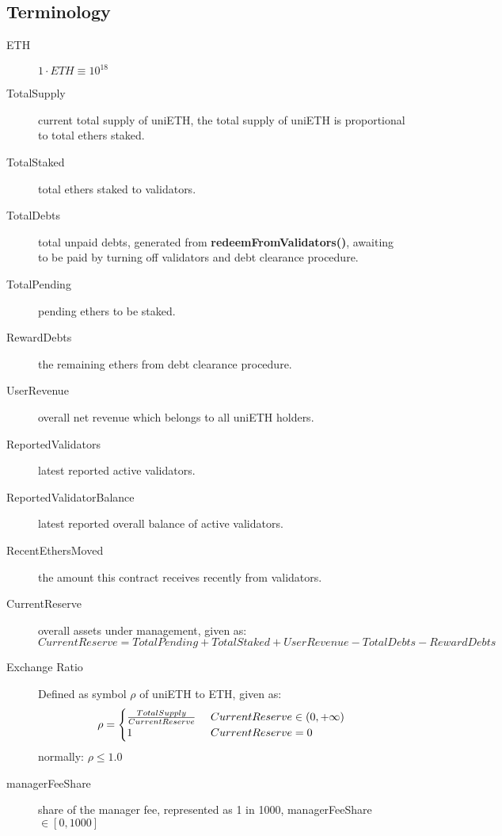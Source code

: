 \documentclass{article}
\begin{document}
\subsection{Terminology}
\begin{description}
   \item[ETH] $1\cdot ETH \equiv 10^{18}$
   \item[TotalSupply] current total supply of uniETH, the total supply of uniETH is proportional to total ethers staked.
   \item[TotalStaked] total ethers staked to validators.
   \item[TotalDebts] total unpaid debts, generated from \textbf{redeemFromValidators()}, awaiting to be paid by turning off validators and debt clearance procedure.
   \item[TotalPending] pending ethers to be staked.
   \item[RewardDebts] the remaining ethers from debt clearance procedure.
   \item[UserRevenue] overall net revenue which belongs to all uniETH holders.
   \item[ReportedValidators] latest reported active validators.
   \item[ReportedValidatorBalance] latest reported overall balance of active validators.
   \item[RecentEthersMoved] the amount this contract receives recently from validators.
   \item[CurrentReserve] overall assets under management, given as:
   \[CurrentReserve = TotalPending + TotalStaked + UserRevenue - TotalDebts - RewardDebts\]
   \item[Exchange Ratio] Defined as symbol $\rho$ of uniETH to ETH, given as: 
   \begin{equation}
    \rho = \begin{cases}
        \frac{TotalSupply}{CurrentReserve} & \text{ $ CurrentReserve \in (0, +\infty) $}\\
        1 & \text{ $ CurrentReserve = 0 $}
    \end{cases}
    \end{equation}
    normally: $\rho \leq 1.0$
   \item[managerFeeShare] share of the manager fee, represented as 1 in 1000, managerFeeShare $\in[0,1000]$ 
\end{description}

\newtheorem{theorem}{Theorem}[section]
\newtheorem{corollary}{Corollary}[theorem]
\newtheorem{lemma}[theorem]{Lemma}
\end{document}
